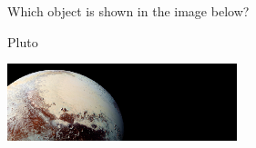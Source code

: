 \documentclass[addpoints]{exam}
\begin{document}
\begin{questions}
\question
Which object is shown in the image below?
\vspace{1em}

\begin{minipage}{0.3\textwidth}
    \centering
    \begin{choices}
    \choice
    \correctchoice Pluto
    \choice
    \choice 
    \end{choices}
\end{minipage}%
\begin{minipage}{0.5\textwidth}
    \centering
    \includegraphics[width=0.5\textwidth,trim={0 0 2in 0}, clip]{Figures/Figure7.6.jpg}
\end{minipage}
\vspace{1em}





\end{questions}
\end{document}
